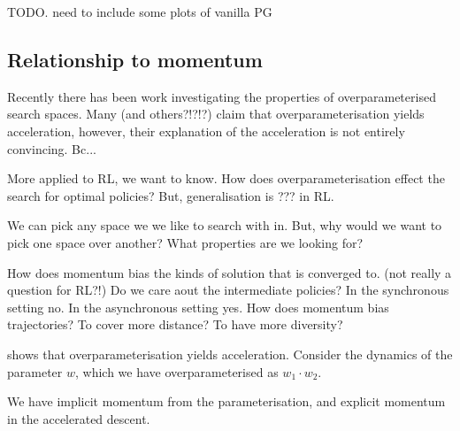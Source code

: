 

{\color{red}TODO. need to include some plots of vanilla PG}

\subsection{Relationship to momentum}

Recently there has been work investigating the properties of overparameterised search spaces.
Many \cite{Arora2018} (and others?!?!?) claim that overparameterisation yields acceleration, however,
their explanation of the acceleration is not entirely convincing. Bc...

More applied to RL, we want to know. How does overparameterisation effect the search for optimal policies?
But, generalisation is ??? in RL.


We can pick any space we we like to search with in. But, why would we want to pick one space over another?
What properties are we looking for?



How does momentum bias the kinds of solution that is converged to. (not really a question for RL?!)
Do we care aout the intermediate policies? In the synchronous setting no. In the asynchronous setting yes.
How does momentum bias trajectories? To cover more distance? To have more diversity?


\cite{Arora2018} shows that overparameterisation yields acceleration. Consider
the dynamics of the parameter $w$, which we have overparameterised as $w_1 \cdot w_2$.



We have implicit momentum from the parameterisation, and explicit momentum in the accelerated descent.



